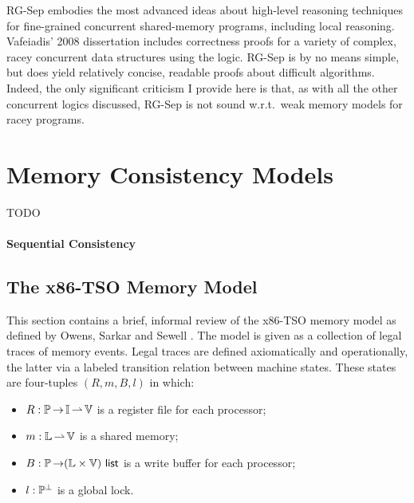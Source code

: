 \documentclass[11pt]{report}
\begin{document}
RG-Sep embodies the most advanced ideas about high-level reasoning techniques for fine-grained concurrent shared-memory programs, including local reasoning. Vafeiadis' 2008 dissertation \cite{VafeiadisDissertation} includes correctness proofs for a variety of complex, racey concurrent data structures using the logic. RG-Sep is by no means simple, but does yield relatively concise, readable proofs about difficult algorithms. Indeed, the only significant criticism I provide here is that, as with all the other concurrent logics discussed, RG-Sep is not sound w.r.t.~weak memory models for racey programs.

\section{Memory Consistency Models}

TODO 

\paragraph{Sequential Consistency} 

\subsection{The x86-TSO Memory Model}
\label{sec:memory-model}

This section contains a brief, informal review of the x86-TSO memory model as defined by Owens, Sarkar and Sewell \cite{DBLP:conf/tphol/OwensSS09}. The model is given as a collection of legal traces of memory events. Legal traces are defined axiomatically and operationally, the latter via a labeled transition relation between machine states. These states are four-tuples $(R,m,B,l)$ in which: \begin{itemize}
	\item $R : \mathbb{P} \operatorname{\rightarrow} \mathbb{I} \operatorname{\rightharpoonup} \mathbb{V}$ is a register file for each processor;
	\item $m : \mathbb{L} \operatorname{\rightharpoonup} \mathbb{V}$ is a shared memory; 
	\item $B : \mathbb{P} \operatorname{\rightarrow} (\mathbb{L} \times \mathbb{V})~\mathsf{list}$ is a write buffer for each processor; 
	\item $l : \mathbb{P}^\bot$ is a global lock. 
\end{itemize}
\end{document}

